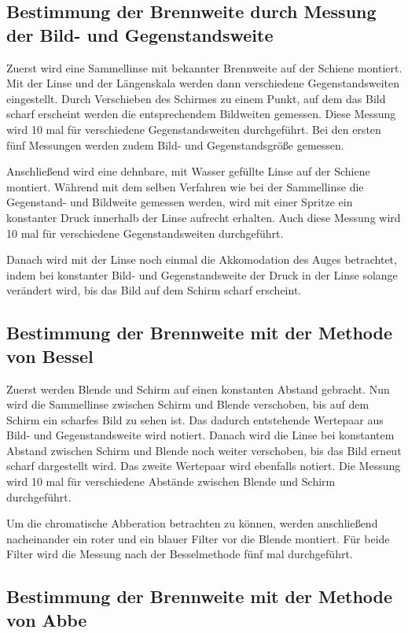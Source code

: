 \subsection{Bestimmung der Brennweite durch Messung der Bild- und Gegenstandsweite}

Zuerst wird eine Sammellinse mit bekannter Brennweite auf der Schiene montiert.
Mit der Linse und der
Längenskala werden dann verschiedene Gegenstandsweiten eingestellt. Durch
Verschieben des Schirmes zu einem Punkt, auf dem das Bild scharf erscheint
werden die entsprechendem Bildweiten gemessen. Diese Messung wird 10 mal für
verschiedene Gegenstandsweiten durchgeführt.
Bei den ersten fünf Messungen werden zudem Bild- und Gegenstandsgröße gemessen.

Anschließend wird eine dehnbare, mit Wasser gefüllte Linse auf der Schiene montiert.
Während mit dem selben Verfahren wie bei der Sammellinse die Gegenstand- und Bildweite
gemessen werden, wird mit einer Spritze ein konstanter Druck innerhalb der
Linse aufrecht erhalten. Auch diese Messung wird 10 mal für verschiedene
Gegenstandsweiten durchgeführt.

Danach wird mit der Linse noch einmal die Akkomodation des Auges betrachtet, indem
bei konstanter Bild- und Gegenstandsweite der Druck in der Linse solange verändert
wird, bis das Bild auf dem Schirm scharf erscheint.

\subsection{Bestimmung der Brennweite mit der Methode von Bessel}

Zuerst werden Blende und Schirm auf einen konstanten Abstand gebracht. Nun
wird die Sammellinse zwischen Schirm und Blende verschoben, bis auf dem Schirm
ein scharfes Bild zu sehen ist. Das dadurch entstehende Wertepaar aus Bild-
und Gegenstandsweite wird notiert. Danach wird die Linse bei konstantem Abstand
zwischen Schirm und Blende noch weiter verschoben, bis das Bild erneut scharf
dargestellt wird. Das zweite Wertepaar wird ebenfalls notiert. Die Messung
wird 10 mal für verschiedene Abstände zwischen Blende und Schirm durchgeführt.

Um die chromatische Abberation betrachten zu können, werden
anschließend nacheinander ein roter und ein blauer Filter vor die
Blende montiert. Für beide Filter wird die Messung nach der Besselmethode
fünf mal durchgeführt.

\subsection{Bestimmung der Brennweite mit der Methode von Abbe}


